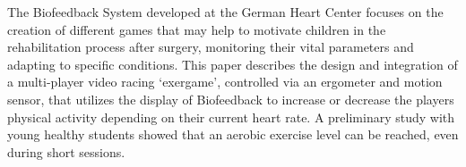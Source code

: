 The Biofeedback System developed at the German Heart Center focuses on the creation of different games that may help to motivate children in the rehabilitation process after surgery, monitoring their vital parameters and adapting to specific conditions.
This paper describes the design and integration of a multi-player video racing ‘exergame’,  controlled via an ergometer and motion sensor, that utilizes the display of Biofeedback to increase or decrease the players physical activity depending on their current heart rate. A preliminary study with young healthy students showed that an aerobic exercise level can be reached, even during short sessions.